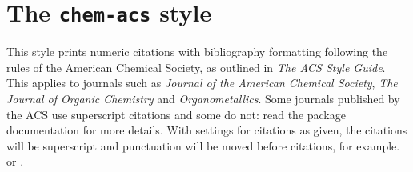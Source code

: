 \documentclass[a4paper]{article}
\begin{document}
\section*{The \texttt{chem-acs} style}

This style prints numeric citations with bibliography
formatting following the rules of the American Chemical Society,
as outlined in \emph{The ACS Style Guide}.
This applies to journals such as \emph{Journal of the American
Chemical Society}, \emph{The Journal of Organic Chemistry}
and \emph{Organometallics}.  Some journals published by the ACS
use superscript citations and some do not: read the package
documentation for more details. With settings for citations as 
given, the citations will be superscript and punctuation will be
moved before citations, for example. or
\autocite{Arduengo1991}.
\end{document}
